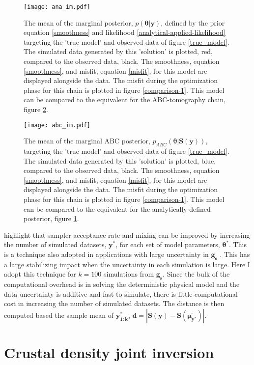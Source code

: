 \begin{figure}[H]
	\centering
	\texttt{[image: ana\_im.pdf]}
	\caption{The mean of the marginal posterior, $p(\bm{\theta}|\bm{y})$, defined by the prior equation \ref{smoothness} and likelihood \ref{analytical-applied-likelihood} targeting the 'true model' and observed data of figure \ref{true_model}. The simulated data generated by this 'solution' is plotted, red, compared to the observed data, black. The smoothness, equation \ref{smoothness}, and misfit, equation \ref{misfit}, for this model are displayed alongside the data. The misfit during the optimization phase for this chain is plotted in figure \ref{comparison-1}. This model can be compared to the equivalent for the ABC-tomography chain, figure \ref{abc-im-1}.}
	\label{ana-im-1}
\end{figure}

\begin{figure}[H]
	\centering
	\texttt{[image: abc\_im.pdf]}
	\caption{The mean of the marginal ABC posterior, $p_{ABC}(\bm{\theta}|\bm{S}(\bm{y}))$, targeting the 'true model' and observed data of figure \ref{true_model}. The simulated data generated by this 'solution' is plotted, blue, compared to the observed data, black. The smoothness, equation \ref{smoothness}, and misfit, equation \ref{misfit}, for this model are displayed alongside the data. The misfit during the optimization phase for this chain is plotted in figure \ref{comparison-1}. This model can be compared to the equivalent for the analytically defined posterior, figure \ref{ana-im-1}.}
	\label{abc-im-1}
\end{figure}

\citet{Sisson2010a} highlight that sampler acceptance rate and mixing can be improved by increasing the number of simulated datasets, $\bm{y^*}$, for each set of model parameters, $\bm{\theta^*}$. This is a technique also adopted in applications with large uncertainty in $\bm{g_s}$ \citep{Ratmann2009,Wood2010}. This has a large stabilizing impact when the uncertainty in each simulation is large. Here I adopt this technique for $k = 100$ simulations from $\bm{g_s}$. Since the bulk of the computational overhead is in solving the deterministic physical model and the data uncertainty is additive and fast to simulate, there is little computational cost in increasing  the number of simulated datasets. The distance is then computed based the sample mean of $\bm{y^*_{1:k}}$, $\bm{d} = |\bm{S}(\bm{y})-\bm{S}(\bm{\bar{\mu_{y^*}}})|$.


\section{Crustal density joint inversion}

